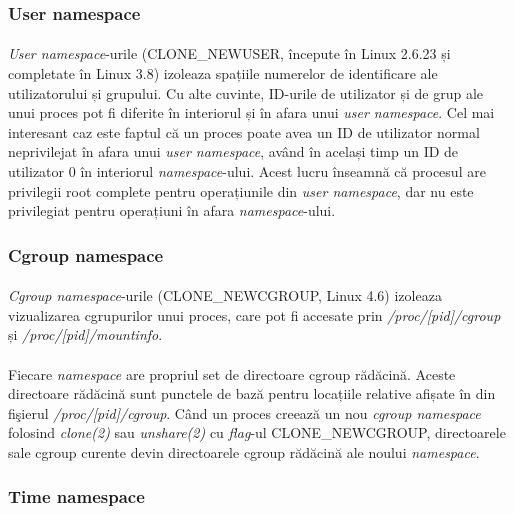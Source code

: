         \subsubsection{User namespace}
            \paragraph{} \textit{User namespace}-urile (CLONE\_NEWUSER, începute în Linux 2.6.23 și completate în Linux 3.8) izoleaza spațiile numerelor de identificare ale utilizatorului și grupului. Cu alte cuvinte, ID-urile de utilizator și de grup ale unui proces pot fi diferite în interiorul și în afara unui \textit{user namespace}. Cel mai interesant caz este faptul că un proces poate avea un ID de utilizator normal neprivilejat în afara unui \textit{user namespace}, având în același timp un ID de utilizator 0 în interiorul \textit{namespace}-ului. Acest lucru înseamnă că procesul are privilegii root complete pentru operațiunile din \textit{user namespace}, dar nu este privilegiat pentru operațiuni în afara \textit{namespace}-ului. \cite{ns:lwn}

        \subsubsection{Cgroup namespace}
            \paragraph{} \textit{Cgroup namespace}-urile (CLONE\_NEWCGROUP, Linux 4.6) izoleaza vizualizarea cgrupurilor unui proces, care pot fi accesate prin \textit{/proc/[pid]/cgroup} și \textit{/proc/[pid]/mountinfo}. \cite{ns:cgroup}
            \paragraph{} Fiecare \textit{namespace} are propriul set de directoare cgroup rădăcină. Aceste directoare rădăcină sunt punctele de bază pentru locațiile relative afișate în din fişierul \textit{/proc/[pid]/cgroup}. Când un proces creează un nou \textit{cgroup namespace} folosind \textit{clone(2)} sau \textit{unshare(2)} cu \textit{flag}-ul CLONE\_NEWCGROUP, directoarele sale cgroup curente devin directoarele cgroup rădăcină ale noului \textit{namespace}. \cite{ns:cgroup}

        \subsubsection{Time namespace}
